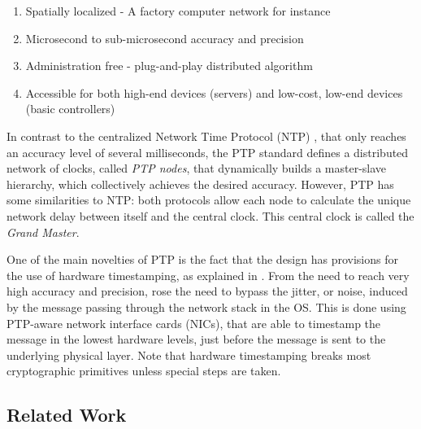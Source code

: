 \documentclass[11pt]{article}
\begin{document}
\begin{enumerate}

  \item Spatially localized - A factory computer network for instance

  \item Microsecond to sub-microsecond accuracy and precision

  \item Administration free - plug-and-play distributed algorithm

  \item Accessible for both high-end devices (servers) and low-cost, low-end devices (basic controllers)

\end{enumerate}

In contrast to the centralized Network Time Protocol (NTP) \cite{rfc958}, that only reaches an accuracy level of several milliseconds, the PTP standard defines a distributed network of clocks, called \emph{PTP nodes}, that dynamically builds a master-slave hierarchy, which collectively achieves the desired accuracy. However, PTP has some similarities to NTP: both protocols allow each node to calculate the unique network delay between itself and the central clock. This central clock is called the \emph{Grand Master}.


One of the main novelties of PTP is the fact that the design has provisions for the use of hardware timestamping, as explained in \cite{version2}. From the need to reach very high accuracy and precision, rose the need to bypass the jitter, or noise, induced by the message passing through the network stack in the OS. This is done using PTP-aware network interface cards (NICs), that are able to timestamp the message in the lowest hardware levels, just before the message is sent to the underlying physical layer. Note that hardware timestamping breaks most cryptographic primitives unless special steps are taken.



\subsection{Related Work}\label{related}
\end{document}

